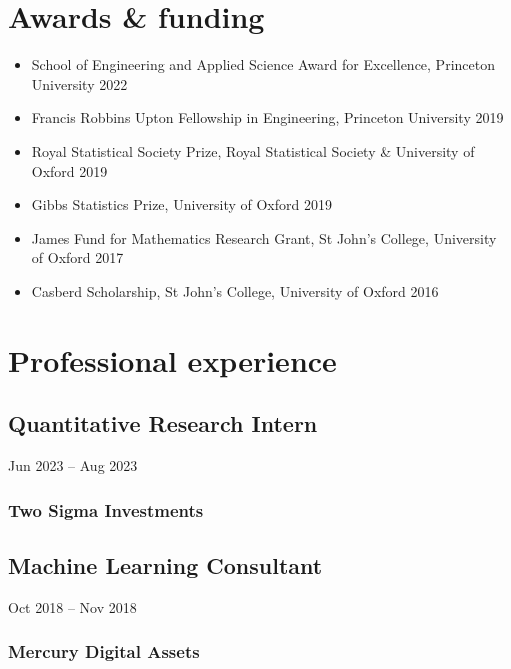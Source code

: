 \documentclass{wgu-cv}
\begin{document}
\vspace{0.1cm}
\section{Awards \& funding}
\vspace{-0.22cm}

\begin{itemize}
  \item School of Engineering and Applied Science Award for Excellence,
    Princeton University
    \hfill 2022%
  \item Francis Robbins Upton Fellowship in Engineering,
    Princeton University
    \hfill 2019%
  \item Royal Statistical Society Prize,
    Royal Statistical Society \& University of Oxford
    \hfill 2019%
  \item Gibbs Statistics Prize,
    University of Oxford
    \hfill 2019%
  \item James Fund for Mathematics Research Grant,
    St John's College, University of Oxford
    \hfill 2017%
  \item Casberd Scholarship,
    St John's College, University of Oxford
    \hfill 2016%
\end{itemize}

\pagebreak

\section{Professional experience}

\subsection{Quantitative Research Intern}
{Jun 2023 -- Aug 2023}
\subsubsection{Two Sigma Investments}
\vspace{-0.20cm}

\subsection{Machine Learning Consultant}
{Oct 2018 -- Nov 2018}
\subsubsection{Mercury Digital Assets}
\vspace{-0.18cm}
\end{document}

